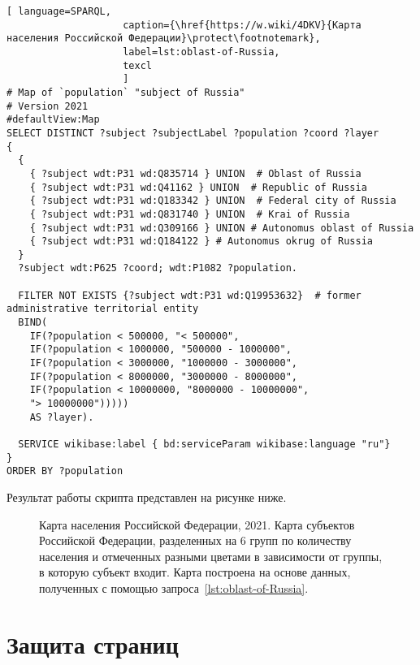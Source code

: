 \begin{lstlisting}[ language=SPARQL, 
                    caption={\href{https://w.wiki/4DKV}{Карта населения Российской Федерации}\protect\footnotemark},
                    label=lst:oblast-of-Russia,
                    texcl 
                    ]
# Map of `population` "subject of Russia"
# Version 2021
#defaultView:Map
SELECT DISTINCT ?subject ?subjectLabel ?population ?coord ?layer
{
  {
    { ?subject wdt:P31 wd:Q835714 } UNION  # Oblast of Russia
    { ?subject wdt:P31 wd:Q41162 } UNION  # Republic of Russia
    { ?subject wdt:P31 wd:Q183342 } UNION  # Federal city of Russia
    { ?subject wdt:P31 wd:Q831740 } UNION  # Krai of Russia
    { ?subject wdt:P31 wd:Q309166 } UNION # Autonomus oblast of Russia
    { ?subject wdt:P31 wd:Q184122 } # Autonomus okrug of Russia
  }   
  ?subject wdt:P625 ?coord; wdt:P1082 ?population.
  
  FILTER NOT EXISTS {?subject wdt:P31 wd:Q19953632}  # former administrative territorial entity
  BIND(
    IF(?population < 500000, "< 500000",
    IF(?population < 1000000, "500000 - 1000000",
    IF(?population < 3000000, "1000000 - 3000000",
    IF(?population < 8000000, "3000000 - 8000000",
    IF(?population < 10000000, "8000000 - 10000000",
    "> 10000000")))))
    AS ?layer).
  
  SERVICE wikibase:label { bd:serviceParam wikibase:language "ru"}
}
ORDER BY ?population
\end{lstlisting}%

Результат работы скрипта представлен на рисунке ниже.

\begin{figure*}[h]

    \setlength{\fboxsep}{0pt}%
    \setlength{\fboxrule}{1pt}%
	\caption[Карта населения Российской Федерации, 2021.]{Карта населения Российской Федерации, 2021. Карта субъектов Российской Федерации, разделенных на 6 групп по количеству населения и отмеченных разными цветами в зависимости от группы, в которую субъект входит. Карта построена на основе данных, полученных с помощью запроса~\protect\ref{lst:oblast-of-Russia}.}%
\end{figure*} 

\section{Защита страниц}

